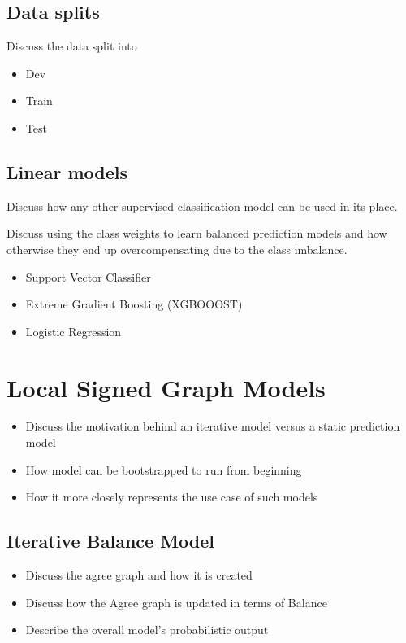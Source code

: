 \subsection{Data splits}
    Discuss the data split into
    \begin{itemize}
        \item Dev
        \item Train
        \item Test
    \end{itemize}
\subsection{Linear models}
    Discuss how any other supervised classification model can be used in its place.

    Discuss using the class weights to learn balanced prediction models and how otherwise they end up overcompensating due to the class imbalance.
        \begin{itemize}
        \item Support Vector Classifier
        \item Extreme Gradient Boosting (XGBOOOST) 
        \item Logistic Regression
    \end{itemize}

\section{Local Signed Graph Models}
    \begin{itemize}
        \item Discuss the motivation behind an iterative model versus a static prediction model
        \item How model can be bootstrapped to run from beginning
        \item How it more closely represents the use case of such models
    \end{itemize}
    \subsection{Iterative Balance Model}
        \begin{itemize}
            \item Discuss the agree graph and how it is created
            \item Discuss how the Agree graph is updated in terms of Balance
            \item Describe the overall model's probabilistic output
        \end{itemize}
